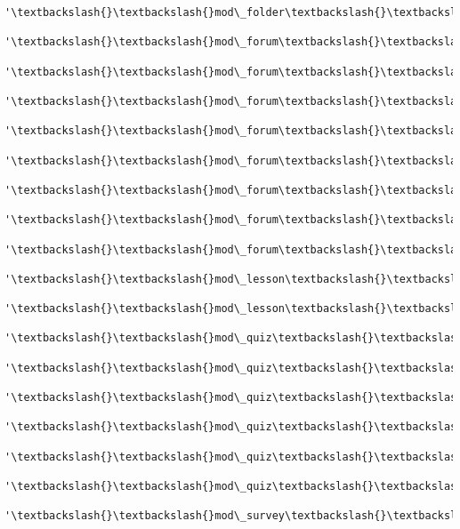 \documentclass[11pt]{article}
\begin{document}
\begin{Verbatim}[commandchars=\\\{\}]
          '\textbackslash{}\textbackslash{}mod\_folder\textbackslash{}\textbackslash{}event\textbackslash{}\textbackslash{}course\_module\_viewed',
          '\textbackslash{}\textbackslash{}mod\_forum\textbackslash{}\textbackslash{}event\textbackslash{}\textbackslash{}assessable\_uploaded',
          '\textbackslash{}\textbackslash{}mod\_forum\textbackslash{}\textbackslash{}event\textbackslash{}\textbackslash{}course\_module\_viewed',
          '\textbackslash{}\textbackslash{}mod\_forum\textbackslash{}\textbackslash{}event\textbackslash{}\textbackslash{}course\_searched',
          '\textbackslash{}\textbackslash{}mod\_forum\textbackslash{}\textbackslash{}event\textbackslash{}\textbackslash{}discussion\_created',
          '\textbackslash{}\textbackslash{}mod\_forum\textbackslash{}\textbackslash{}event\textbackslash{}\textbackslash{}discussion\_subscription\_created',
          '\textbackslash{}\textbackslash{}mod\_forum\textbackslash{}\textbackslash{}event\textbackslash{}\textbackslash{}discussion\_viewed',
          '\textbackslash{}\textbackslash{}mod\_forum\textbackslash{}\textbackslash{}event\textbackslash{}\textbackslash{}post\_created',
          '\textbackslash{}\textbackslash{}mod\_forum\textbackslash{}\textbackslash{}event\textbackslash{}\textbackslash{}post\_updated',
          '\textbackslash{}\textbackslash{}mod\_lesson\textbackslash{}\textbackslash{}event\textbackslash{}\textbackslash{}content\_page\_viewed',
          '\textbackslash{}\textbackslash{}mod\_lesson\textbackslash{}\textbackslash{}event\textbackslash{}\textbackslash{}lesson\_started',
          '\textbackslash{}\textbackslash{}mod\_quiz\textbackslash{}\textbackslash{}event\textbackslash{}\textbackslash{}attempt\_reviewed',
          '\textbackslash{}\textbackslash{}mod\_quiz\textbackslash{}\textbackslash{}event\textbackslash{}\textbackslash{}attempt\_started',
          '\textbackslash{}\textbackslash{}mod\_quiz\textbackslash{}\textbackslash{}event\textbackslash{}\textbackslash{}attempt\_submitted',
          '\textbackslash{}\textbackslash{}mod\_quiz\textbackslash{}\textbackslash{}event\textbackslash{}\textbackslash{}attempt\_summary\_viewed',
          '\textbackslash{}\textbackslash{}mod\_quiz\textbackslash{}\textbackslash{}event\textbackslash{}\textbackslash{}attempt\_viewed',
          '\textbackslash{}\textbackslash{}mod\_quiz\textbackslash{}\textbackslash{}event\textbackslash{}\textbackslash{}course\_module\_viewed',
          '\textbackslash{}\textbackslash{}mod\_survey\textbackslash{}\textbackslash{}event\textbackslash{}\textbackslash{}course\_module\_viewed\textbackslash{}\textbackslash{}mod\_survey\textbackslash{}\textbackslash{}event\textbackslash{}\textbackslash{}response\_submitted',

\end{Verbatim}
\end{document}
